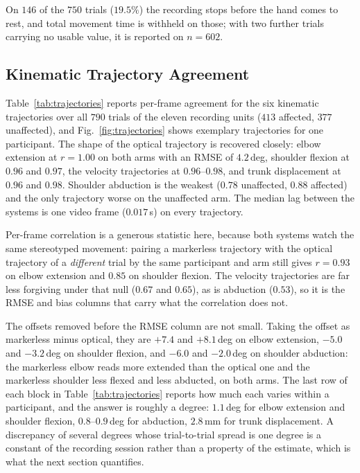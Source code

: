 \documentclass[conference]{IEEEtran}
\begin{document}
On $146$ of the $750$ trials ($19.5\%$) the recording stops before the hand comes
to rest, and total movement time is withheld on those; with two further trials
carrying no usable value, it is reported on $n = 602$.

\subsection{Kinematic Trajectory Agreement}
Table~\ref{tab:trajectories} reports per-frame agreement for the six kinematic
trajectories over all $790$ trials of the eleven recording units ($413$ affected,
$377$ unaffected), and Fig.~\ref{fig:trajectories} shows exemplary trajectories
for one participant. The shape of the optical trajectory is recovered closely:
elbow extension at $r = 1.00$ on
both arms with an RMSE of $4.2$\,deg, shoulder flexion at $0.96$ and $0.97$, the
velocity trajectories at $0.96$--$0.98$, and trunk displacement at $0.96$ and
$0.98$. Shoulder abduction is the weakest ($0.78$ unaffected, $0.88$ affected)
and the only trajectory worse on the unaffected arm. The median lag between the
systems is one video frame ($0.017$\,s) on every trajectory.

Per-frame correlation is a generous statistic here, because both systems watch
the same stereotyped movement: pairing a markerless trajectory with the optical
trajectory of a \emph{different} trial by the same participant and arm still
gives $r = 0.93$ on elbow extension and $0.85$ on shoulder flexion. The velocity
trajectories are far less forgiving under that null ($0.67$ and $0.65$), as is
abduction ($0.53$), so it is the RMSE and bias columns that carry what the
correlation does not.

The offsets removed before the RMSE column are not small. Taking the
offset as markerless minus optical, they are $+7.4$ and $+8.1$\,deg on elbow
extension, $-5.0$ and $-3.2$\,deg on shoulder flexion, and $-6.0$ and
$-2.0$\,deg on shoulder abduction: the markerless elbow reads more extended than
the optical one and the markerless shoulder less flexed and less abducted, on
both arms. The last row of each block in Table~\ref{tab:trajectories} reports
how much each varies within a participant, and the answer is roughly a degree:
$1.1$\,deg for elbow extension and shoulder flexion, $0.8$--$0.9$\,deg for
abduction, $2.8$\,mm for trunk displacement. A discrepancy of several degrees
whose trial-to-trial spread is one degree is a constant of the recording session
rather than a property of the estimate, which is what the next section
quantifies.
\end{document}
